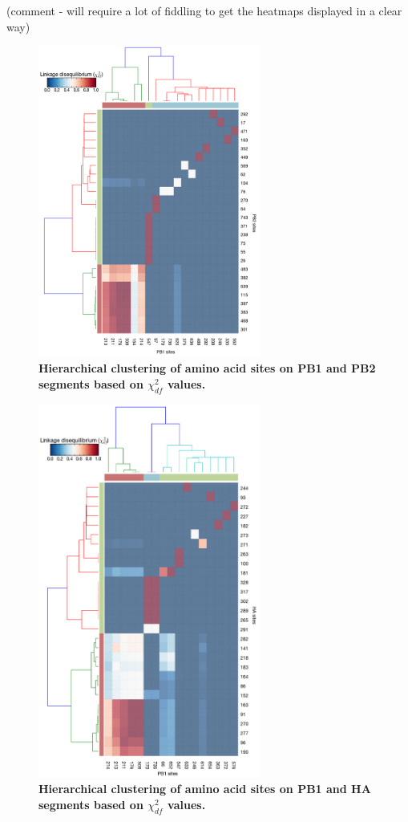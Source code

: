 \documentclass[11pt,oneside,letterpaper]{article}
\begin{document}
(comment - will require a lot of fiddling to get the heatmaps displayed in a clear way)
\begin{figure}[h]
	\centering	
	\includegraphics[width=0.65\textwidth]	{figures/Chi_PB1_PB2.png}
	\caption{\textbf{Hierarchical clustering of amino acid sites on PB1 and PB2 segments based on $\chi^{2}_{df}$ values.}}
	\label{ChiPB1PB2}
\end{figure}

\begin{figure}[h]
	\centering	
	\includegraphics[width=0.65\textwidth]	{figures/Chi_PB1_HA.png}
	\caption{\textbf{Hierarchical clustering of amino acid sites on PB1 and HA segments based on $\chi^{2}_{df}$ values.}}
	\label{ChiPB1HA}
\end{figure}
\end{document}
